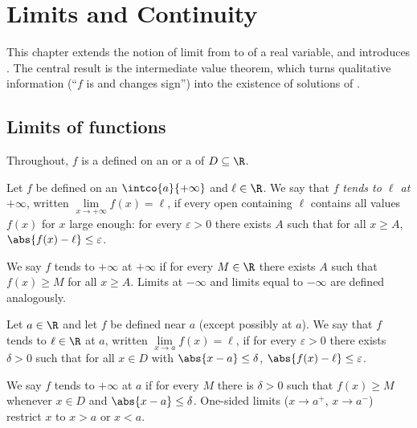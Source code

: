 \chapter{Limits and Continuity}\label{ch:g12:limcont}

This chapter extends the notion of limit from  to  of a
real variable, and introduces . The central result is the
intermediate value theorem, which turns qualitative information (``$f$ is
 and changes sign'') into the existence of solutions of .

\section{Limits of functions}

Throughout, $f$ is a  defined on an  or a  of 
$D \subseteq \R$.

\begin{definition}\label{def:g12:limcont:liminf}
Let $f$ be defined on an  $\intco{a}{+\infty}$ and $\ell \in \R$. We
say that $f$ \emph{tends to $\ell$ at $+\infty$},
written $\lim\limits_{x\to+\infty} f(x) = \ell$, if every open 
containing $\ell$ contains all values $f(x)$ for $x$ large enough:
for every $\varepsilon > 0$ there exists $A$ such that for all $x \geq A$,
$\abs{f(x) - \ell} \leq \varepsilon$.

We say $f$ tends to $+\infty$ at $+\infty$ if for every $M \in \R$ there
exists $A$ such that $f(x) \geq M$ for all $x \geq A$. Limits at $-\infty$
and limits equal to $-\infty$ are defined analogously.
\end{definition}

\begin{definition}\label{def:g12:limcont:limpoint}
Let $a \in \R$ and let $f$ be defined near $a$ (except possibly at $a$). We
say that $f$ tends to $\ell \in \R$ at $a$, written
$\lim\limits_{x \to a} f(x) = \ell$, if for every $\varepsilon > 0$ there
exists $\delta > 0$ such that for all $x \in D$ with
$\abs{x - a} \leq \delta$, $\abs{f(x) - \ell} \leq \varepsilon$.

We say $f$ tends to $+\infty$ at $a$ if for every $M$ there is $\delta > 0$
such that $f(x) \geq M$ whenever $x \in D$ and $\abs{x - a} \leq \delta$.
One-sided limits ($x \to a^+$, $x \to a^-$) restrict $x$ to $x > a$ or
$x < a$.
\end{definition}

